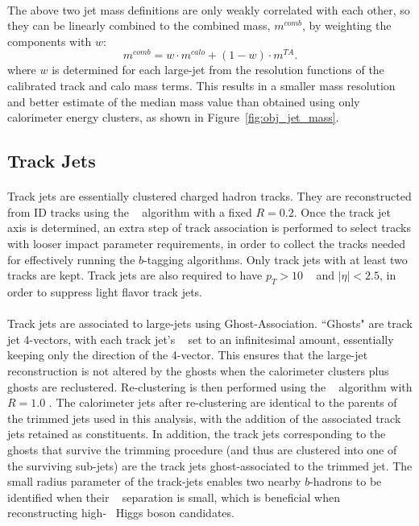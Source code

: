 \paragraph{}
The above two jet mass definitions are only weakly correlated with each other, so they can be linearly combined to the combined mass, $m^{comb}$, by weighting the components with $w$:
\begin{equation}
m^{comb} = w\cdot m^{calo}+(1-w)\cdot m^{TA}.
\end{equation}
where $w$ is determined for each large-\R jet from the resolution functions of the calibrated track and calo mass terms.
This results in a smaller mass resolution and better estimate of the median mass value than obtained using only calorimeter energy clusters, as shown in Figure~\ref{fig:obj_jet_mass}.

\subsection{Track Jets}
\label{obj:trackjet}
\paragraph{}
Track jets are essentially clustered charged hadron tracks. 
They are reconstructed from ID tracks using the \akt~ algorithm with a fixed $R=0.2$. 
Once the track jet axis is determined, an extra step of track association is performed to select tracks with looser impact parameter requirements, in order to collect the tracks needed for effectively running the $b$-tagging algorithms.
Only track jets with at least two tracks are kept.
Track jets are also required to have $p_T > 10$ \GeV~ and $|\eta| < 2.5$, in order to suppress light flavor track jets.

\paragraph{}
Track jets are associated to large-\R jets using Ghost-Association.
``Ghosts" are track jet 4-vectors, with each track jet's \pt~ set to an infinitesimal amount, essentially keeping only the direction of the 4-vector.
This ensures that the large-\R jet reconstruction is not altered by the ghosts when the calorimeter clusters plus ghosts are reclustered.
Re-clustering is then performed using the \akt~ algorithm with $R=1.0$ .
The calorimeter jets after re-clustering are identical to the parents of the trimmed jets used in this analysis, with the addition of the associated track jets retained as constituents.
In addition, the track jets corresponding to the ghosts that survive the trimming procedure (and thus are clustered into one of the surviving sub-jets) are the track jets ghost-associated to the trimmed jet.
The small radius parameter of the track-jets enables two nearby $b$-hadrons to be identified when their \DR~ separation is small, which is beneficial when reconstructing high-\pt~ Higgs boson candidates.


